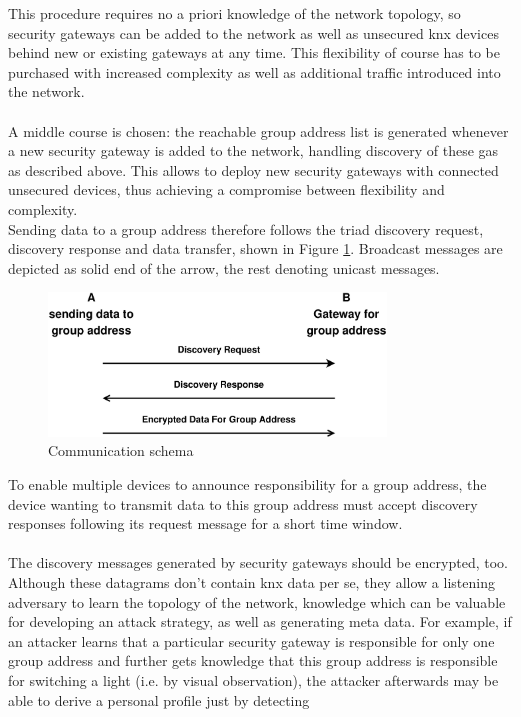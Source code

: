 This procedure requires no a priori knowledge of
the network topology, so security gateways can be added to the network as well as unsecured \gls{knx} devices behind new or existing gateways at any time. This
flexibility of course has to be purchased with increased complexity as well as additional traffic introduced into the network.
\\
\\
A middle course is chosen: the reachable group address list is generated whenever a new security gateway is added to the network,
 handling discovery of these \glspl{ga} as described
above. This allows to deploy new security gateways with connected unsecured devices, thus achieving a compromise between flexibility and complexity. 
\\
Sending data to a group address therefore follows the triad discovery request, discovery response and data transfer, shown in Figure \ref{fig:prot1}. Broadcast
messages are depicted as solid end of the arrow, the rest denoting unicast messages.
\begin{figure}
  \centering
    \includegraphics[width=0.8\textwidth]{figures/protokoll1.eps}
 \caption{Communication schema}
 \label{fig:prot1}
\end{figure}
To enable multiple devices to announce responsibility for a group address, the device wanting to transmit data to this group address must accept discovery responses
following its request message for a short time window.
\\
\\
The discovery messages generated by security gateways should be encrypted, too. Although these datagrams don't contain \gls{knx} data per se, they allow
a listening adversary to learn the topology of the network, knowledge which can be valuable for developing an attack strategy, as well as generating meta data.
For example, if an attacker learns that a particular security gateway is responsible for only one group address and further gets knowledge that this 
group address is responsible for switching a light (i.e. by visual observation), the attacker afterwards may be able to derive a personal profile just by detecting
